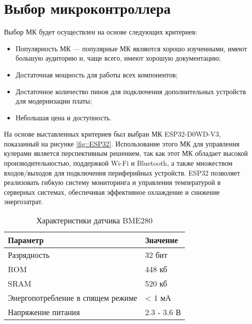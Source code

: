 \section {Выбор микроконтроллера}

Выбор МК будет осуществлен на основе следующих критериев:

\begin{itemize}

	\item Популярность МК --- популярные МК являются хорошо изученными, имеют большую аудиторию и, чаще всего, имеют хорошую документацию;
	
	\item Достаточная мощность для работы всех компонентов;
	
	\item Достаточное количество пинов для подключения дополнительных устройств для модернизации платы;

	\item Небольшая цена и доступность.
	
\end{itemize}

На основе выставленных критериев был выбран МК ESP32-D0WD-V3, показанный на рисунке \ref{fig::ESP32}. Использование этого МК для управления кулерами является перспективным решением, так как этот МК обладает высокой производительностью, поддержкой Wi-Fi и Bluetooth, а также множеством входов/выходов для подключения периферийных устройств. ESP32 позволяет реализовать гибкую систему мониторинга и управления температурой в серверных системах, обеспечивая эффективное охлаждение и снижение энергозатрат.


\begin{table}[h!]
	\centering
	\begin{tabular}{| m{9cm} | m{6cm} |}
		\hline
		Параметр & Значение \\ \hline
		Разрядность & 32 бит \\ \hline
		ROM & 448 кб \\ \hline
		SRAM & 520 кб \\ \hline
		Энергопотребление в спящем режиме & < 1 мА\\ \hline
		Напряжение питания & 2.3 - 3.6 В \\ \hline
		
	\end{tabular}
	\caption{Характеристики датчика BME280}
	\label{tab::TempSensorCharacteristics}
\end{table}
